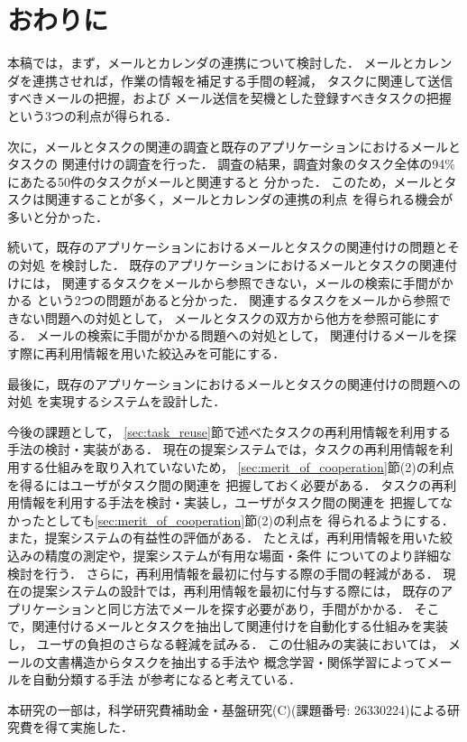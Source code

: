 \documentclass[submit,techreq,noauthor,dvipdfmx]{ipsj}
\begin{document}
\section{おわりに}\label{chap:conclusion}

本稿では，まず，メールとカレンダの連携について検討した．
メールとカレンダを連携させれば，作業の情報を補足する手間の軽減，
タスクに関連して送信すべきメールの把握，および
メール送信を契機とした登録すべきタスクの把握という3つの利点が得られる．

次に，メールとタスクの関連の調査と既存のアプリケーションにおけるメールとタスクの
関連付けの調査を行った．
調査の結果，調査対象のタスク全体の94\%にあたる50件のタスクがメールと関連すると
分かった．
このため，メールとタスクは関連することが多く，メールとカレンダの連携の利点
を得られる機会が多いと分かった．

続いて，既存のアプリケーションにおけるメールとタスクの関連付けの問題とその対処
を検討した．
既存のアプリケーションにおけるメールとタスクの関連付けには，
関連するタスクをメールから参照できない，メールの検索に手間がかかる
という2つの問題があると分かった．
関連するタスクをメールから参照できない問題への対処として，
メールとタスクの双方から他方を参照可能にする．
メールの検索に手間がかかる問題への対処として，
関連付けるメールを探す際に再利用情報を用いた絞込みを可能にする．

最後に，既存のアプリケーションにおけるメールとタスクの関連付けの問題への対処
を実現するシステムを設計した．

今後の課題として，
\ref{sec:task_reuse}節で述べたタスクの再利用情報を利用する手法の検討・実装がある．
現在の提案システムでは，タスクの再利用情報を利用する仕組みを取り入れていないため，
\ref{sec:merit_of_cooperation}節(2)の利点を得るにはユーザがタスク間の関連を
把握しておく必要がある．
タスクの再利用情報を利用する手法を検討・実装し，ユーザがタスク間の関連を
把握してなかったとしても\ref{sec:merit_of_cooperation}節(2)の利点を
得られるようにする．
また，提案システムの有益性の評価がある．
たとえば，再利用情報を用いた絞込みの精度の測定や，提案システムが有用な場面・条件
についてのより詳細な検討を行う．
さらに，再利用情報を最初に付与する際の手間の軽減がある．
現在の提案システムの設計では，再利用情報を最初に付与する際には，
既存のアプリケーションと同じ方法でメールを探す必要があり，手間がかかる．
そこで，関連付けるメールとタスクを抽出して関連付けを自動化する仕組みを実装し，
ユーザの負担のさらなる軽減を試みる．
この仕組みの実装においては，
メールの文書構造からタスクを抽出する手法\cite{hasegawa1999}や
概念学習・関係学習によってメールを自動分類する手法
\cite{okumura2004}\cite{yamaguchi2013}が参考になると考えている．

\begin{acknowledgment}
本研究の一部は，科学研究費補助金・基盤研究(C)(課題番号: 26330224)による研究費を得て実施した．
\end{acknowledgment}


\end{document}
